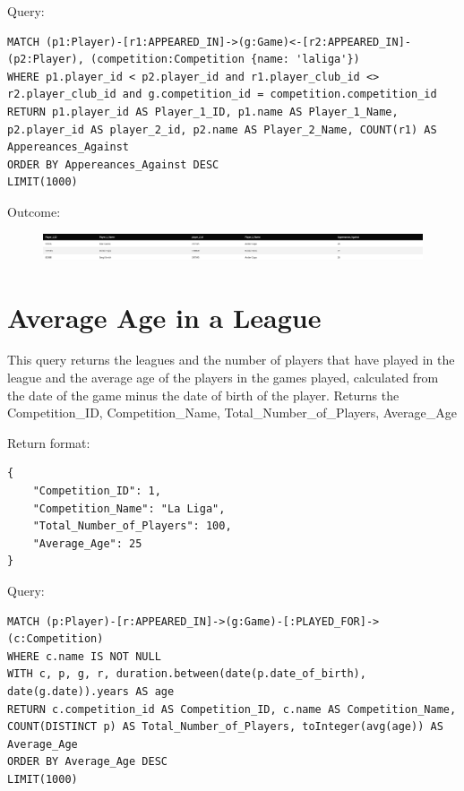 \documentclass{Configuration_Files/PoliMi3i_thesis}
\begin{document}
Query:

\begin{lstlisting}[language=Cypher]
MATCH (p1:Player)-[r1:APPEARED_IN]->(g:Game)<-[r2:APPEARED_IN]-(p2:Player), (competition:Competition {name: 'laliga'})
WHERE p1.player_id < p2.player_id and r1.player_club_id <> r2.player_club_id and g.competition_id = competition.competition_id
RETURN p1.player_id AS Player_1_ID, p1.name AS Player_1_Name, p2.player_id AS player_2_id, p2.name AS Player_2_Name, COUNT(r1) AS Appereances_Against
ORDER BY Appereances_Against DESC
LIMIT(1000)
\end{lstlisting}


Outcome:

\begin{figure}[H]
    \centering
    \includegraphics[width=\linewidth]{Project Template/Images/query_output/q3.png}
\end{figure}



\section{Average Age in a League}
This query returns the leagues and the number of players that have played in the league and the average age of the players in the games played, calculated from the date of the game minus the date of birth of the player. Returns the Competition\_ID, Competition\_Name, Total\_Number\_of\_Players, Average\_Age

Return format:
\begin{lstlisting}[style=json]
{
    "Competition_ID": 1,
    "Competition_Name": "La Liga",
    "Total_Number_of_Players": 100,
    "Average_Age": 25
}
\end{lstlisting}


Query:

\begin{lstlisting}[language=Cypher]
MATCH (p:Player)-[r:APPEARED_IN]->(g:Game)-[:PLAYED_FOR]->(c:Competition)
WHERE c.name IS NOT NULL
WITH c, p, g, r, duration.between(date(p.date_of_birth), date(g.date)).years AS age
RETURN c.competition_id AS Competition_ID, c.name AS Competition_Name, COUNT(DISTINCT p) AS Total_Number_of_Players, toInteger(avg(age)) AS Average_Age
ORDER BY Average_Age DESC
LIMIT(1000)
\end{lstlisting}
\end{document}
